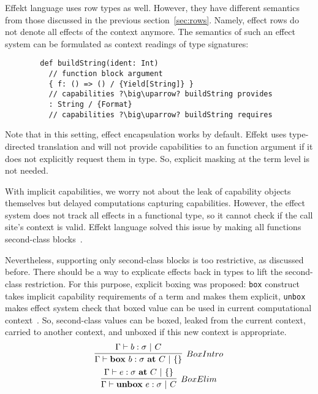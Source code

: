 \documentclass[conference]{IEEEtran}
\newcommand{\ap}{~}
\begin{document}
    Effekt language uses row types as well.
    However, they have different semantics from those discussed in the previous section~\ref{sec:rows}.
    Namely, effect rows do not denote all effects of the context anymore.
    The semantics of such an effect system can be formulated as context readings of type signatures:
    \begin{verbatim}
        def buildString(ident: Int)
          // function block argument
          { f: () => () / {Yield[String]} }
          // capabilities ?\big\uparrow? buildString provides
          : String / {Format}
          // capabilities ?\big\uparrow? buildString requires
    \end{verbatim}

    Note that in this setting, effect encapsulation works by default.
    Effekt uses type-directed translation and will not provide capabilities to an function argument if it does not explicitly request them in type.
    So, explicit masking at the term level is not needed.

    With implicit capabilities, we worry not about the leak of capability objects themselves but delayed computations capturing capabilities.
    However, the effect system does not track all effects in a functional type, so it cannot check if the call site's context is valid.
    Effekt language solved this issue by making all functions second-class blocks~\cite{brachthauser2020effects}.

    Nevertheless, supporting only second-class blocks is too restrictive, as discussed before.
    There should be a way to explicate effects back in types to lift the second-class restriction.
    For this purpose, explicit boxing was proposed:
    \texttt{box} construct takes implicit capability requirements of a term and makes them explicit,
    \texttt{unbox} makes effect system check that boxed value can be used in current computational context~\cite{hannan1998type, brachthauser2022effects}.
    So, second-class values can be boxed, leaked from the current context, carried to another context, and unboxed if this new context is appropriate.
    \begin{gather*}
        \infer[BoxIntro]{\Gamma \vdash \mathbf{box}\ap b : \sigma~ \mathbf{at}\ap C ~|~ \{\}}{\Gamma \vdash b : \sigma ~|~ C}
        \\
        \infer[BoxElim]{\Gamma \vdash \mathbf{unbox}\ap e : \sigma ~|~ C}{\Gamma \vdash e : \sigma ~\mathbf{at}~C ~|~ \{\}}
    \end{gather*}
\end{document}
